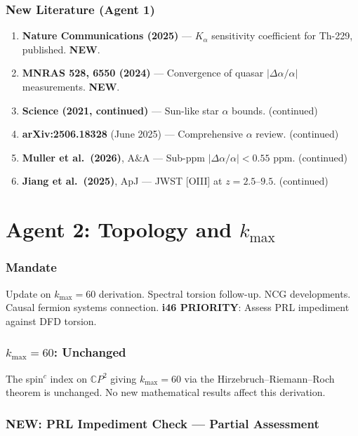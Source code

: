 \documentclass[11pt,a4paper]{article}
\newcommand{\NEW}{\textcolor{dfdblue}{\textbf{NEW}}}
\newcommand{\CP}{\mathbb{C}P}
\begin{document}
\section{New Literature (Agent 1)}

\begin{enumerate}
\item \textbf{Nature Communications (2025)} --- $K_\alpha$ sensitivity coefficient for Th-229, published. \NEW.
\item \textbf{MNRAS 528, 6550 (2024)} --- Convergence of quasar $|\Delta\alpha/\alpha|$ measurements. \NEW.
\item \textbf{Science (2021, continued)} --- Sun-like star $\alpha$ bounds. (continued)
\item \textbf{arXiv:2506.18328} (June 2025) --- Comprehensive $\alpha$ review. (continued)
\item \textbf{Muller et al.\ (2026)}, A\&A --- Sub-ppm $|\Delta\alpha/\alpha| < 0.55$ ppm. (continued)
\item \textbf{Jiang et al.\ (2025)}, ApJ --- JWST [OIII] at $z = 2.5$--$9.5$. (continued)
\end{enumerate}


\part{Agent 2: Topology and $k_{\max}$}
\label{part:agent2}

\section{Mandate}

Update on $k_{\max} = 60$ derivation. Spectral torsion follow-up. NCG developments. Causal fermion systems connection. \textbf{i46 PRIORITY}: Assess PRL impediment against DFD torsion.

\section{$k_{\max} = 60$: Unchanged}

The spin$^c$ index on $\CP^2$ giving $k_{\max} = 60$ via the Hirzebruch--Riemann--Roch theorem is unchanged. No new mathematical results affect this derivation.

\section{\NEW: PRL Impediment Check --- Partial Assessment}
\end{document}
